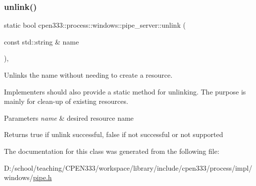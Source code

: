 \subsubsection{\texorpdfstring{unlink()}{unlink()}\hspace{0.1cm}{\footnotesize\ttfamily [2/2]}}
{\footnotesize\ttfamily static bool cpen333\+::process\+::windows\+::pipe\+\_\+server\+::unlink (\begin{DoxyParamCaption}\item[{const std\+::string \&}]{name }\end{DoxyParamCaption})\hspace{0.3cm}{\ttfamily [inline]}, {\ttfamily [static]}}



Unlinks the name without needing to create a resource. 

Implementers should also provide a static method for unlinking. The purpose is mainly for clean-\/up of existing resources.


\begin{DoxyParams}{Parameters}
{\em name} & desired resource name \\
\hline
\end{DoxyParams}
\begin{DoxyReturn}{Returns}
{\ttfamily true} if unlink successful, {\ttfamily false} if not successful or not supported 
\end{DoxyReturn}


The documentation for this class was generated from the following file\+:\begin{DoxyCompactItemize}
\item 
D\+:/school/teaching/\+C\+P\+E\+N333/workspace/library/include/cpen333/process/impl/windows/\hyperlink{impl_2windows_2pipe_8h}{pipe.\+h}\end{DoxyCompactItemize}
